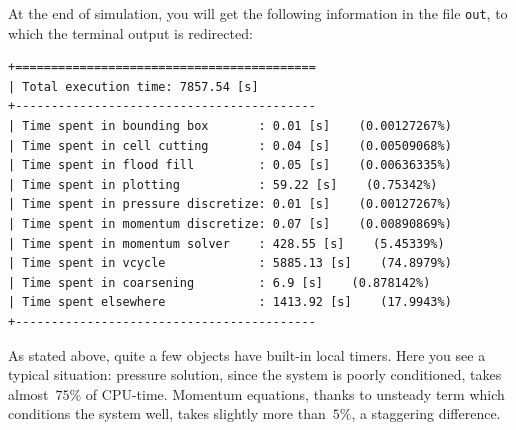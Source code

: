 At the end of simulation, you will get the following information in the file
{\tt out}, to which the terminal output is redirected:
%
{\small \begin{verbatim}
+==========================================
| Total execution time: 7857.54 [s]
+------------------------------------------
| Time spent in bounding box       : 0.01 [s]    (0.00127267%)
| Time spent in cell cutting       : 0.04 [s]    (0.00509068%)
| Time spent in flood fill         : 0.05 [s]    (0.00636335%)
| Time spent in plotting           : 59.22 [s]    (0.75342%)
| Time spent in pressure discretize: 0.01 [s]    (0.00127267%)
| Time spent in momentum discretize: 0.07 [s]    (0.00890869%)
| Time spent in momentum solver    : 428.55 [s]    (5.45339%)
| Time spent in vcycle             : 5885.13 [s]    (74.8979%)
| Time spent in coarsening         : 6.9 [s]    (0.878142%)
| Time spent elsewhere             : 1413.92 [s]    (17.9943%)
+------------------------------------------
\end{verbatim}}
%
As stated above, quite a few {\psiboil} objects have built-in local
timers. Here you see a typical situation: pressure solution, since
the system is poorly conditioned, takes almost~$75 \%$ of CPU-time. 
Momentum equations, thanks to unsteady term which conditions the
system well, takes slightly more than~$5 \%$, a staggering difference.

